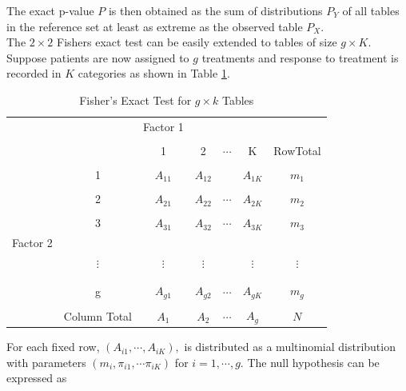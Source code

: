 \documentclass[12pt,oneside]{report}
\theoremstyle{definition}
\theoremstyle{mystyle}
\begin{document}
The exact p-value $P$ is then obtained as the sum of distributions $P_{Y}$ of all tables in  the reference set at least as extreme as the observed table $P_{X}$.\\
The $2 \times 2$ Fishers exact test can be easily extended to tables of size $g\times K$. Suppose patients are now assigned to $g$ treatments and response to treatment is recorded in $K$ categories as shown in Table  \ref{table:fisherg}.
\begin{table}[h!]
	\caption{Fisher's Exact Test for $g \times k$ Tables}
	\begin{center}
		
		\begin{tabular}{c c |c  c c c|c}
			\hline
			& &Factor 1   &  & && \\ 
			&&&&&&\\
			& & 1& 2 &$\cdots$&K&RowTotal \\ \hline
			
			\hline
			&&&&&&\\
			
			&1&$ A_{11}$& $A_{12}$ &&$A_{1K}$&$m_{1}$ \\ \cline{2-7}
			&&&&&&\\
			&2&$ A_{21}$& $A_{22}$ &$\cdots$&$A_{2K}$&$m_{2}$ \\ \cline{2-7}
			&&&&&&\\
			&3&$ A_{31}$& $A_{32}$ &$\cdots$&$A_{3K}$&$m_{3}$ \\ \cline{2-7}
			Factor 2	&&&&&&\\
			&$\vdots$&$\vdots$&$\vdots$&&$\vdots$&$\vdots$\\
			&&&&&&\\\cline{2-7}
			&&&&&&\\
			&g&$ A_{g1}$& $A_{g2}$ &$\cdots$&$A_{gK}$&$m_{g}$ \\ \cline{2-7}
			&&&&&&\\
			&Column Total & $A_{1}$ & $A_{2}$ &$\cdots$&$A_{g}$& $N$ \\\hline 
			
			
		\end{tabular}
		\label{table:fisherg}
	\end{center}
\end{table}
For each fixed row, $(A_{i1},\cdots,A_{iK}),$ is distributed as a multinomial distribution with parameters $(m_{i},\pi_{i1},\cdots \pi_{iK})$ for $i=1,\cdots,g$. The null hypothesis can be expressed as \\
\end{document}
